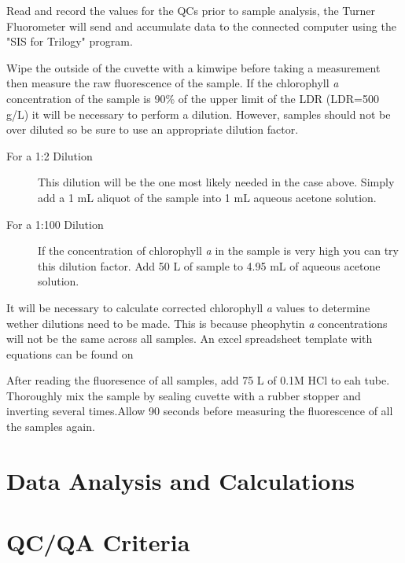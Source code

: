 \documentclass[12pt]{../SOP2}
\begin{document}
\NP Read and record the values for the QCs prior to sample analysis, the Turner Fluorometer will send and accumulate data to the connected computer using the "SIS for Trilogy" program.

\NP Wipe the outside of the cuvette with a kimwipe before taking a measurement then measure the raw fluorescence of the sample. If the chlorophyll \textit{a} concentration of the sample is 90\% of the upper limit of the LDR (LDR=500 \micro g/L) it will be necessary to perform a dilution. However, samples should not be over diluted so be sure to use an appropriate dilution factor. 

\begin{description} 
\item[For a 1:2 Dilution] This dilution will be the one most likely needed in the case above. Simply add a 1 mL aliquot of the sample into 1 mL aqueous acetone solution.
\item[For a 1:100 Dilution] If the concentration of chlorophyll \textit{a} in the sample is very high you can try this dilution factor. Add 50 \micro L of sample to 4.95 mL of aqueous acetone solution. 
\end{description}

\NP It will be necessary to calculate corrected chlorophyll \textit{a} values to determine wether dilutions need to be made. This is because pheophytin \textit{a} concentrations will not be the same across all samples. An excel spreadsheet template with equations can be found on %

\NP After reading the fluoresence of all samples, add 75 \micro L of  0.1M HCl to eah tube. Thoroughly mix the sample by sealing cuvette with a rubber stopper and inverting several times.Allow 90 seconds before measuring the fluorescence of all the samples again. 

\section{Data Analysis and Calculations}

\section{QC/QA Criteria}
\end{document}
